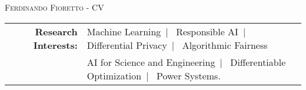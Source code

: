 \documentclass[localFont,alternative]{documentMETADATA}
\begin{document}
\makecvheader\sloppy\allowdisplaybreaks

	\makecvfooter
		{\textsc{}} %
		{\textsc{Ferdinando Fioretto - CV}}
		{\thepage}


	\begin{tabular}{r l} 
	{\bf Research Interests:} &
	{Machine Learning}~|~
	{Responsible AI}~|~
	{Differential Privacy}~|~
	{Algorithmic Fairness}\\
	&{AI for Science and Engineering}~|~
	{Differentiable Optimization}~|~
	{Power Systems}.
	\end{tabular}



		 
	
	  
	
	 
	          
	
	
\end{document}
